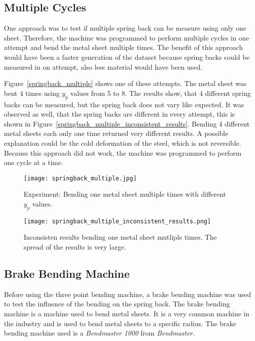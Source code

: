 \subsection{Multiple Cycles}
One approach was to test if multiple spring back can be measure using only one sheet.
Therefore, the machine was programmed to perform multiple cycles in one attempt and bend the metal sheet multiple times. The benefit of this approach would have been a faster generation of the dataset because spring backs could be measured in on attempt, also less material would have been used.

Figure~\ref{springback_multiple} shows one of these attempts. The metal sheet was bent 4 times using $y_p$ values from 5 to 8. The results show, that 4 different spring backs can be measured, but the spring back does not vary like expected. It was observed as well, that the spring backs are different in every attempt, this is shown in Figure~\ref{springback_multiple_inconsistent_results}.
Bending 4 different metal sheets each only one time returned very different results.
A possible explanation could be the cold deformation of the steel, which is not reversible. Because this approach did not work, the machine was programmed to perform one cycle at a time.

\captionsetup{width=0.45\textwidth}

\begin{figure}[H]
    \centering
    \begin{minipage}[b]{0.5\textwidth}
        \centering
        \texttt{[image: springback\_multiple.jpg]} %
        \caption{Experiment: Bending one metal sheet multiple times with different $y_p$ values.}
        \label{springback_multiple}
    \end{minipage}\hfill
    \begin{minipage}[b]{0.5\textwidth}
        \centering
        \texttt{[image: springback\_multiple\_inconsistent\_results.png]} %
        \caption{Inconsisten results bending one metal sheet mutliple times. The spread of the results is very large.}
        \label{springback_multiple_inconsistent_results}
    \end{minipage}
    \label{fig:springback_multiple_overview}
\end{figure}

\subsection{Brake Bending Machine}
Before using the three point bending machine, a brake bending machine was used to test the influence of the bending on the spring back. The brake bending machine is a machine used to bend metal sheets. It is a very common machine in the industry and is used to bend metal sheets to a specific radius. The brake bending machine used is a \textit{Bendmaster 1000} from \textit{Bendmaster}.

